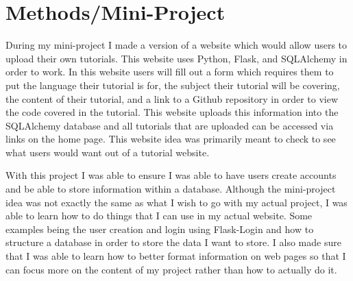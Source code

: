 \documentclass[10pt,twocolumn]{article}
\begin{document}
\section{Methods/Mini-Project}

During my mini-project I made a version of a website which would allow users to upload their own tutorials. This website uses Python, Flask, and SQLAlchemy in order to work. In this website users will fill out a form which requires them to put the language their tutorial is for, the subject their tutorial will be covering, the content of their tutorial, and a link to a Github repository in order to view the code covered in the tutorial. This website uploads this information into the SQLAlchemy database and all tutorials that are uploaded can be accessed via links on the home page. This website idea was primarily meant to check to see what users would want out of a tutorial website. 

With this project I was able to ensure I was able to have users create accounts and be able to store information within a database. Although the mini-project idea was not exactly the same as what I wish to go with my actual project, I was able to learn how to do things that I can use in my actual website. Some examples being the user creation and login using Flask-Login and how to structure a database in order to store the data I want to store. I also made sure that I was able to learn how to better format information on web pages so that I can focus more on the content of my project rather than how to actually do it.
\end{document}
